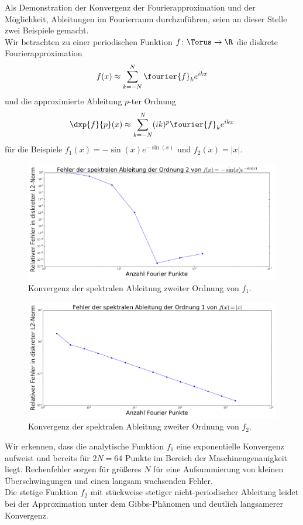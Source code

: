 \begin{mathbsp}
Als Demonstration der Konvergenz der Fourierapproximation und der Möglichkeit, Ableitungen im Fourierraum durchzuführen, seien an dieser Stelle zwei Beispiele gemacht.\\
Wir betrachten zu einer periodischen Funktion $f\colon\Torus\to\R$ die diskrete Fourierapproximation
\[f(x)\approx \sum_{k=-N}^N\fourier{f}_ke^{ikx}\]
und die approximierte Ableitung $p$-ter Ordnung
\[\dxp{f}{p}(x)\approx \sum_{k=-N}^N(ik)^p\fourier{f}_ke^{ikx}\]
für die Beispiele $f_1(x)=-\sin(x)e^{-\sin(x)}$ und $f_2(x)=|x|$.
\begin{figure}[!htb]
  \includegraphics[width=0.9\linewidth]{Figures/spectral_derivative_error_cont.png}
  \caption{Konvergenz der spektralen Ableitung zweiter Ordnung von $f_1$.}
\end{figure}
\begin{figure}[!htb]
  \includegraphics[width=0.9\linewidth]{Figures/spectral_derivative_error_discont.png}
  \caption{Konvergenz der spektralen Ableitung zweiter Ordnung von $f_2$.}
\end{figure}
Wir erkennen, dass die analytische Funktion $f_1$ eine exponentielle Konvergenz aufweist und bereits für $2N=64$ Punkte im Bereich der Maschinengenauigkeit liegt. Rechenfehler sorgen für größeres $N$ für eine Aufsummierung von kleinen Überschwingungen und einen langsam wachsenden Fehler.\\
Die stetige Funktion $f_2$ mit stückweise stetiger nicht-periodischer Ableitung leidet bei der Approximation unter dem Gibbs-Phänomen und deutlich langsamerer Konvergenz.
\end{mathbsp}

